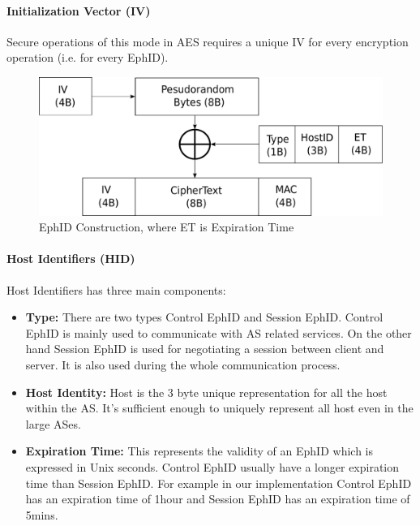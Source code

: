 \paragraph{Initialization Vector (IV)}
Secure operations of this mode in AES requires a unique IV for every encryption operation (i.e. for every EphID).

\begin{figure}[th!]
\centering
\includegraphics[scale=0.5]{Figures/ephid_construction.pdf}
\decoRule
\caption[EphID Construction]{EphID Construction, where ET is Expiration Time}
\label{fig:ephid_con}
\end{figure}

\paragraph{Host Identifiers (HID)}
\begin{center}
\end{center}
Host Identifiers has three main components:
\begin{itemize}
    \item \textbf{Type:} There are two types Control EphID and Session EphID. Control EphID is mainly used to communicate with AS related services. On the other hand Session EphID is used for negotiating a session between client and server. It is also used during the whole communication process.
    \item \textbf{Host Identity:} Host is the 3 byte unique representation for all the host within the AS. It's sufficient enough to uniquely represent all host even in the large ASes.
    \item \textbf{Expiration Time:} This represents the validity of an EphID which is expressed in Unix seconds. Control EphID usually have a longer expiration time than Session EphID. For example in our implementation Control EphID has an expiration time of 1hour and Session EphID has an expiration time of 5mins.
\end{itemize}

